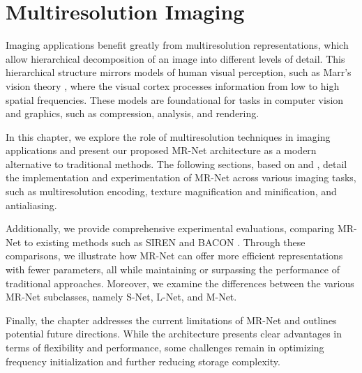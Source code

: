 \chapter{Multiresolution Imaging}
\label{ch:imaging}

Imaging applications benefit greatly from multiresolution representations, which allow hierarchical decomposition of an image into different levels of detail. This hierarchical structure mirrors models of human visual perception, such as Marr's vision theory \citep{marr82}, where the visual cortex processes information from low to high spatial frequencies. These models are foundational for tasks in computer vision and graphics, such as compression, analysis, and rendering.


In this chapter, we explore the role of multiresolution techniques in imaging applications and present our proposed MR-Net architecture as a modern alternative to traditional methods. The following sections, based on \citet{paz2022} and \citet{paz2023mr}, detail the implementation and experimentation of MR-Net across various imaging tasks, such as multiresolution encoding, texture magnification and minification, and antialiasing.

Additionally, we provide comprehensive experimental evaluations, comparing MR-Net to existing methods such as SIREN \citep{sitzmann2019siren} and BACON \citep{bacon2021}. Through these comparisons, we illustrate how MR-Net can offer more efficient representations with fewer parameters, all while maintaining or surpassing the performance of traditional approaches. Moreover, we examine the differences between the various MR-Net subclasses, namely S-Net, L-Net, and M-Net.

Finally, the chapter addresses the current limitations of MR-Net and outlines potential future directions. While the architecture presents clear advantages in terms of flexibility and performance, some challenges remain in optimizing frequency initialization and further reducing storage complexity.








